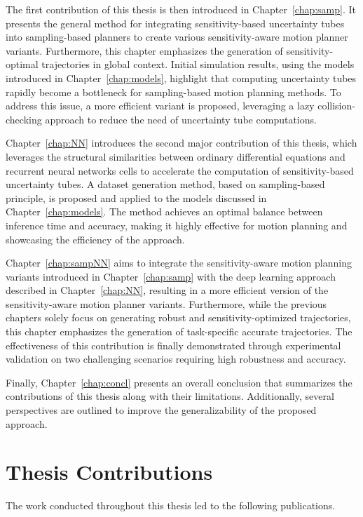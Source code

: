 The first contribution of this thesis is then introduced in Chapter~\ref{chap:samp}.
It presents the general method for integrating sensitivity-based uncertainty tubes into sampling-based planners to create various sensitivity-aware motion planner variants.
Furthermore, this chapter emphasizes the generation of sensitivity-optimal trajectories in global context.
Initial simulation results, using the models introduced in Chapter~\ref{chap:models}, highlight that computing uncertainty tubes rapidly become a bottleneck for sampling-based motion planning methods.
To address this issue, a more efficient variant is proposed, leveraging a lazy collision-checking approach to reduce the need of uncertainty tube computations.

Chapter~\ref{chap:NN} introduces the second major contribution of this thesis, which leverages the structural similarities between ordinary differential equations and recurrent neural networks cells to accelerate the computation of sensitivity-based uncertainty tubes. 
A dataset generation method, based on sampling-based principle, is proposed and applied to the models discussed in Chapter~\ref{chap:models}. 
The method achieves an optimal balance between inference time and accuracy, making it highly effective for motion planning and showcasing the efficiency of the approach.

Chapter~\ref{chap:sampNN} aims to integrate the sensitivity-aware motion planning variants introduced in Chapter~\ref{chap:samp} with the deep learning approach described in Chapter~\ref{chap:NN}, resulting in a more efficient version of the sensitivity-aware motion planner variants.
Furthermore, while the previous chapters solely focus on generating robust and sensitivity-optimized trajectories, this chapter emphasizes the generation of task-specific accurate trajectories.
The effectiveness of this contribution is finally demonstrated through experimental validation on two challenging scenarios requiring high robustness and accuracy.

Finally, Chapter~\ref{chap:concl} presents an overall conclusion that summarizes the contributions of this thesis along with their limitations.
Additionally, several perspectives are outlined to improve the generalizability of the proposed approach.

\section{Thesis Contributions}

The work conducted throughout this thesis led to the following publications. 

